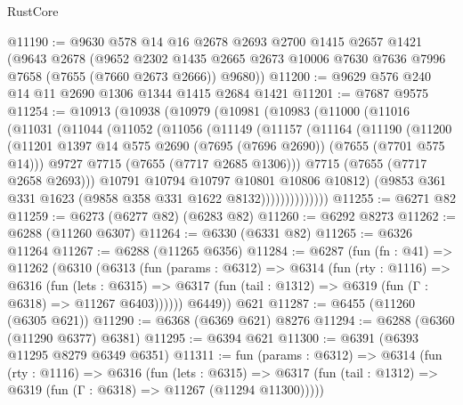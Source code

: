 \begin{lexlean}{RustCore}
\begin{coremodule}
@11190 := @9630
    @578
    @14
    @16
    @2678
    @2693
    @2700
    @1415
    @2657
    @1421
    (@9643
      @2678
      (@9652
        @2302
        @1435
        @2665
        @2673
        @10006
        @7630
        @7636
        @7996
        @7658
        (@7655 (@7660 @2673 @2666))
        @9680))
@11200 := @9629 @576 @240 @14 @11 @2690 @1306 @1344 @1415 @2684 @1421
@11201 := @7687 @9575
@11254 := @10913
    (@10938
      (@10979
        (@10981
          (@10983
            (@11000
              (@11016
                (@11031
                  (@11044
                    (@11052
                      (@11056
                        (@11149
                          (@11157
                            (@11164
                              (@11190
                                (@11200
                                  (@11201
                                    @1397
                                    @14
                                    @575
                                    @2690
                                    (@7695 (@7696 @2690))
                                    (@7655 (@7701 @575 @14)))
                                  @9727
                                  @7715
                                  (@7655 (@7717 @2685 @1306)))
                                @7715
                                (@7655 (@7717 @2658 @2693)))
                              @10791
                              @10794
                              @10797
                              @10801
                              @10806
                              @10812)
                            (@9853 @361 @331 @1623 (@9858 @358 @331 @1622 @8132))))))))))))))
@11255 := @6271 @82
@11259 := @6273 (@6277 @82) (@6283 @82)
@11260 := @6292 @8273
@11262 := @6288 (@11260 @6307)
@11264 := @6330 (@6331 @82)
@11265 := @6326 @11264
@11267 := @6288 (@11265 @6356)
@11284 := @6287
    (fun (fn : @41) =>
    @11262
      (@6310
        (@6313
          (fun (params : @6312) =>
          @6314
            (fun (rty : @1116) =>
            @6316
              (fun (lets : @6315) =>
              @6317 (fun (tail : @1312) => @6319 (fun (Γ : @6318) => @11267 @6403))))))
        @6449))
    @621
@11287 := @6455 (@11260 (@6305 @621))
@11290 := @6368 (@6369 @621) @8276
@11294 := @6288 (@6360 (@11290 @6377) @6381)
@11295 := @6394 @621
@11300 := @6391 (@6393 @11295 @8279 @6349 @6351)
@11311 := fun (params : @6312) =>
  @6314
    (fun (rty : @1116) =>
    @6316
      (fun (lets : @6315) =>
      @6317 (fun (tail : @1312) => @6319 (fun (Γ : @6318) => @11267 (@11294 @11300)))))

\end{coremodule}
\end{lexlean}
